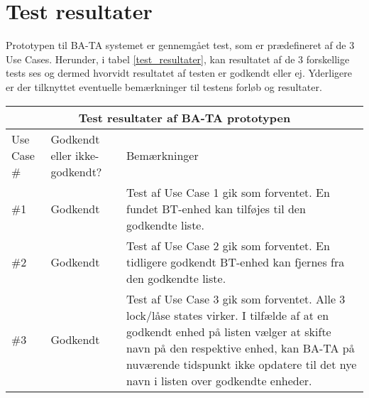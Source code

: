 \graphicspath{{Chapters/TestResultater/}}


\section{Test resultater}

Prototypen til BA-TA systemet er gennemgået test, som er prædefineret af de 3 Use Cases.
Herunder, i tabel \ref{test_resultater}, kan resultatet af de 3 forskellige tests ses og dermed hvorvidt resultatet af testen er godkendt eller ej. Yderligere er der tilknyttet eventuelle bemærkninger til testens forløb og resultater.
\setlength{\tabcolsep}{18pt}

{
\centering
\label{test_resultater}
\begin{tabular}{ |p{4.2cm}|p{4.2cm}|p{4.2cm}|  }
		\hline
		\multicolumn{3}{|c|}{\textbf{Test resultater af BA-TA prototypen}} \\
		\hline
		Use Case \#& Godkendt eller ikke-godkendt? &Bemærkninger \\
		\hline
		\#1 & Godkendt & Test af Use Case 1 gik som forventet. En fundet BT-enhed kan tilføjes til den godkendte liste. \\
		\hline
		\#2 & Godkendt & Test af Use Case 2 gik som forventet. En tidligere godkendt BT-enhed kan fjernes fra den godkendte liste. \\
		\hline
		\#3 & Godkendt & Test af Use Case 3 gik som forventet. Alle 3 lock/låse states virker. I tilfælde af at en godkendt enhed på listen vælger at skifte navn på den respektive enhed, kan BA-TA på nuværende tidspunkt ikke opdatere til det nye navn i listen over godkendte enheder. \\
		\hline
\end{tabular}
}

